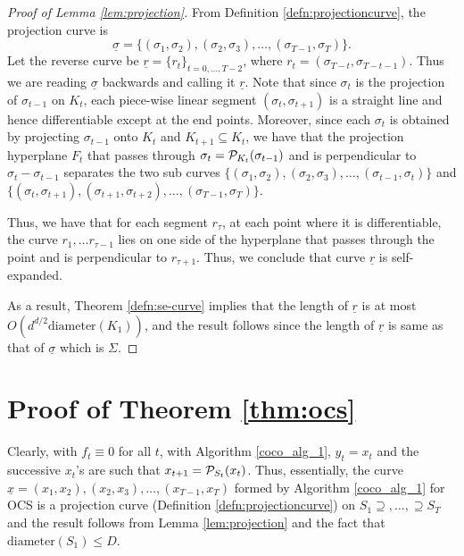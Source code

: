 \begin{proof}[Proof of Lemma \ref{lem:projection}]
From Definition \ref{defn:projectioncurve}, the projection curve is 
$${\underline \sigma}=\{(\sigma_1,\sigma_2), (\sigma_2,\sigma_3), \dots, (\sigma_{T-1},\sigma_T)\}.$$ Let the reverse curve be ${\underline r} = \{r_t\}_{t=0, \dots, T-2}$, where $r_t = (\sigma_{T-t}, \sigma_{T-t-1})$. Thus we are reading ${\underline \sigma}$ backwards and calling it ${\underline r}$. Note that since $\sigma_{t}$ is the projection of $\sigma_{t-1}$ on $K_t$, each piece-wise linear segment $(\sigma_t, \sigma_{t+1})$ is a straight line and hence differentiable except at the end points. Moreover, since each $\sigma_t$ is obtained by projecting $\sigma_{t-1}$ onto $K_t$ and $K_{t+1}\subseteq K_t$, we have that the projection hyperplane 
$F_t$ that passes through $\sigma_t=\mathcal{P}_{K_t}(\sigma_{t-1})$ and is perpendicular to $\sigma_t - \sigma_{t-1}$ separates the two sub curves $\{(\sigma_1,\sigma_2), (\sigma_2,\sigma_3), \dots, (\sigma_{t-1},\sigma_t)\}$ and $\{(\sigma_t,\sigma_{t+1}), (\sigma_{t+1},\sigma_{t+2}), \dots, (\sigma_{T-1},\sigma_T)\}$.


Thus, we have that 
for each segment $r_\tau$, at each point where it is differentiable, the curve $r_1, \dots r_{\tau-1}$ lies on one side of the hyperplane that passes through the point and is perpendicular to $ r_{\tau+1}$. Thus, we conclude that curve ${\underline r}$ is self-expanded.


As a result, Theorem \ref{defn:se-curve} implies that the length of ${\underline r}$ is at most $O(d^{d/2} \text{diameter}(K_1))$, and the result follows since the length of ${\underline r}$ is same as that of ${\underline \sigma}$ which is $\Sigma$. 
\end{proof}

\section{Proof of Theorem \ref{thm:ocs}}
Clearly, with $f_t\equiv0$ for all $t$, with Algorithm \ref{coco_alg_1}, $y_t=x_t$ and the successive $x_t$'s are such that $x_{t+1} = \mathcal{P}_{S_t}(x_{t})$. Thus, essentially, the curve ${\underline x} = (x_1, x_2), (x_2,x_3), \dots, (x_{T-1}, x_{T})$ formed by Algorithm \ref{coco_alg_1} for OCS is a projection curve (Definition \ref{defn:projectioncurve}) on $S_1\supseteq, \dots, \supseteq S_T$ and the result follows from Lemma \ref{lem:projection} and the fact that $\text{diameter}(S_1)\le D$.


